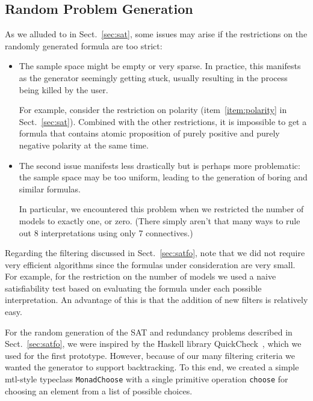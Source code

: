 \subsection{Random Problem Generation}

As we alluded to in Sect.~\ref{sec:sat},
some issues may arise if the restrictions on the randomly generated formula are too strict:
\begin{itemize}
    \item
        The sample space might be empty or very sparse.
        In practice, this manifests as the generator seemingly getting stuck,
        usually resulting in the process being killed by the user.

        For example,
        consider the restriction on polarity (item~\ref{item:polarity} in Sect.~\ref{sec:sat}).
        Combined with the other restrictions,
        it is impossible to get a formula that contains atomic proposition
        of purely positive and purely negative polarity at the same time.

    \item
        The second issue manifests less drastically but is perhaps more problematic:
        the sample space may be too uniform,
        leading to the generation of boring and similar formulas.

        In particular, we encountered this problem
        when we restricted the number of models to exactly one, or zero.
        (There simply aren't that many ways to rule out 8 interpretations
        using only 7 connectives.)
\end{itemize}





Regarding the filtering discussed in Sect.~\ref{sec:satfo},
note that we did not require very efficient algorithms since
the formulas under consideration are very small.
For example, for the restriction on the number of models we used a naive satisfiability test
based on evaluating the formula under each possible interpretation.
An advantage of this is that the addition of new filters is relatively easy.





For the random generation of the SAT and redundancy problems described in Sect.~\ref{sec:satfo},
we were inspired by the Haskell library QuickCheck~\cite{ClaessenHughes:2000:QuickCheck},
which we used for the first prototype.
However, because of our many filtering criteria we wanted the generator to support backtracking.
To this end,
we created a simple mtl-style typeclass \texttt{MonadChoose}
with a single primitive operation \texttt{choose} for choosing an element from a list of possible choices.

